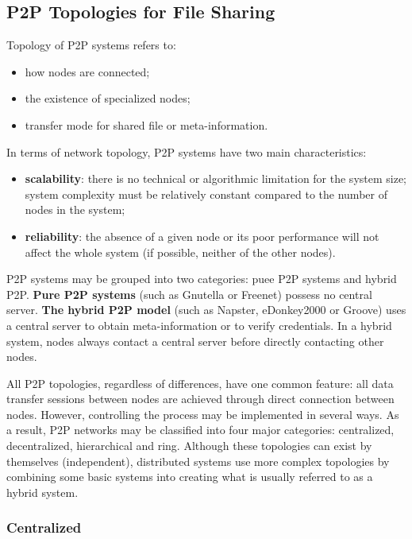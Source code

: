 \subsection{P2P Topologies for File Sharing}

Topology of P2P systems refers to:
\begin{itemize}
  \item how nodes are connected;
  \item the existence of specialized nodes;
  \item transfer mode for shared file or meta-information.
\end{itemize}

In terms of network topology, P2P systems have two main characteristics:

\begin{itemize}
  \item \textbf{scalability}: there is no technical or algorithmic limitation
  for the system size; system complexity must be relatively constant compared
  to the number of nodes in the system;
  \item \textbf{reliability}: the absence of a given node or its poor
  performance will not affect the whole system (if possible, neither of the
  other nodes).
\end{itemize}

P2P systems may be grouped into two categories: puee P2P systems and hybrid
P2P. \textbf{Pure P2P systems} (such as Gnutella or Freenet) possess no
central server. \textbf{The hybrid P2P model} (such as Napster, eDonkey2000 or
Groove) uses a central server to obtain meta-information or to verify
credentials. In a hybrid system, nodes always contact a central server before
directly contacting other nodes.

All P2P topologies, regardless of differences, have one common feature: all
data transfer sessions between nodes are achieved through direct connection
between nodes. However, controlling the process may be implemented in several
ways. As a result, P2P networks may be classified into four major categories:
centralized, decentralized, hierarchical and ring. Although these topologies
can exist by themselves (independent), distributed systems use more complex
topologies by combining some basic systems into creating what is usually
referred to as a hybrid system.

\subsubsection{Centralized}

